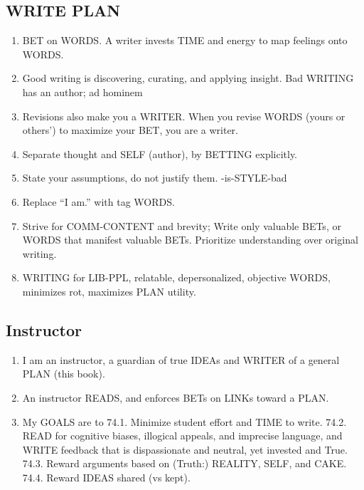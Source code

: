 \documentclass[
]{book}
\providecommand{\tightlist}{%
  \setlength{\itemsep}{0pt}\setlength{\parskip}{0pt}}
\begin{document}
\hypertarget{write-plan}{%
\subsection{WRITE PLAN}\label{write-plan}}

\begin{enumerate}
\def\labelenumi{\arabic{enumi}.}
\setcounter{enumi}{63}
\tightlist
\item
  BET on WORDS. A writer invests TIME and energy to map feelings onto WORDS.
\item
  Good writing is discovering, curating, and applying insight.
  Bad WRITING has an author; ad hominem
\item
  Revisions also make you a WRITER. When you revise WORDS (yours or others')
  to maximize your BET, you are a writer.
\item
  Separate thought and SELF (author), by BETTING explicitly.
\item
  State your assumptions, do not justify them. -is-STYLE-bad
\item
  Replace ``I am.'' with tag WORDS.
\item
  Strive for COMM-CONTENT and brevity; Write only valuable BETs, or WORDS
  that manifest valuable BETs. Prioritize understanding over original writing.
\item
  WRITING for LIB-PPL, relatable, depersonalized, objective WORDS, minimizes rot, maximizes PLAN utility.
\end{enumerate}

\hypertarget{instructor}{%
\subsection{Instructor}\label{instructor}}

\begin{enumerate}
\def\labelenumi{\arabic{enumi}.}
\setcounter{enumi}{71}
\tightlist
\item
  I am an instructor, a guardian of true IDEAs and WRITER of a general PLAN (this book).
\item
  An instructor READS, and enforces BETs on LINKs toward a PLAN.
\item
  My GOALS are to
  74.1. Minimize student effort and TIME to write.
  74.2. READ for cognitive biases, illogical appeals, and imprecise language, and
  WRITE feedback that is dispassionate and neutral, yet invested and True.
  74.3. Reward arguments based on (Truth:) REALITY, SELF, and CAKE.
  74.4. Reward IDEAS shared (vs kept).
\end{enumerate}
\end{document}
